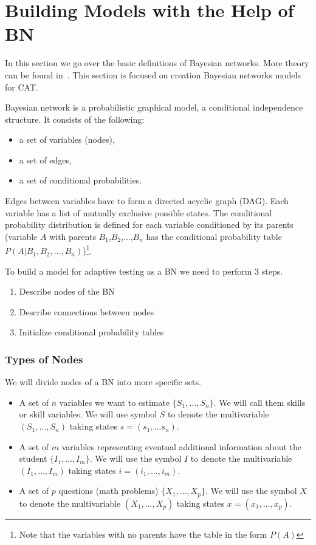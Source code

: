 \section{Building Models with the Help of BN}

In this section we go over the basic definitions of Bayesian networks. More theory can be found in~\cite{Almond2015, Jensen2007, Kjrulff2008, Madsen1999}. This section is focused on creation Bayesian networks models for CAT.

Bayesian network is a probabilistic graphical model, a conditional independence structure. It consists of the following: 
\begin{itemize}
	\item a set of variables (nodes),
	\item a set of edges,
	\item a set of conditional probabilities.
\end{itemize}
Edges between variables have to form a directed acyclic graph (DAG). Each variable has a list of mutually exclusive possible states. The conditional probability distribution is defined for each variable conditioned by its parents (variable $A$ with parents $B_1$,$B_2$,...,$B_n$ has the conditional probability table ${P(A|B_1,B_2,...,B_n)}$)\footnote{Note that the variables with no parents have the table in the form $P(A)$}. 

To build a model for adaptive testing as a BN we need to perform 3 steps.
\begin{enumerate}
	\item Describe nodes of the BN
	\item Describe connections between nodes
	\item Initialize conditional probability tables
\end{enumerate}
 
\subsubsection{Types of Nodes}
We will divide nodes of a BN into more specific sets. 
\begin{itemize} 
\item A set of $n$ variables we want to estimate $\{S_1,\ldots,S_n\}$. 
We will call them skills or skill variables. We will use symbol $S$ to denote the multivariable $(S_1,\ldots,S_n)$ taking states $s = (s_1,\ldots s_n)$. 
\item A set of $m$ variables representing eventual additional information about the student $\{I_1,\ldots,I_m\}$.  
We will use the symbol $I$ to denote the multivariable $(I_1,\ldots,I_m)$ taking states $i = (i_1,\ldots,i_m)$.
\item A set of $p$ questions (math problems) $\{X_1,\ldots,X_p\}$.  
We will use the symbol $X$ to denote the multivariable $(X_1,\ldots,X_p)$ taking states $x = (x_1,\ldots,x_p)$.
\end{itemize}

